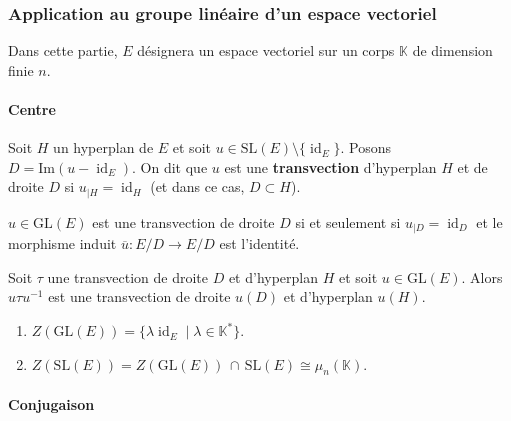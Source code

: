   \subsubsection{Application au groupe linéaire d'un espace vectoriel}

  Dans cette partie, $E$ désignera un espace vectoriel sur un corps $\mathbb{K}$ de dimension finie $n$.

  \paragraph{Centre}


  \begin{definition}
    Soit $H$ un hyperplan de $E$ et soit $u \in \mathrm{SL}(E) \setminus \{ \operatorname{id}_E \}$. Posons $D = \mathrm{Im}(u - \operatorname{id}_E)$. On dit que $u$ est une \textbf{transvection} d'hyperplan $H$ et de droite $D$ si $u_{|H} = \operatorname{id}_H$ (et dans ce cas, $D \subset H$).
  \end{definition}

  \begin{proposition}
    $u \in \mathrm{GL}(E)$ est une transvection de droite $D$ si et seulement si $u_{|D} = \operatorname{id}_D$ et le morphisme induit $\overline{u} : E/D \rightarrow E/D$ est l'identité.
  \end{proposition}

  \begin{proposition}
    Soit $\tau$ une transvection de droite $D$ et d'hyperplan $H$ et soit $u \in \mathrm{GL}(E)$. Alors $u \tau u^{-1}$ est une transvection de droite $u(D)$ et d'hyperplan $u(H)$.
  \end{proposition}

  \begin{corollary}
    \begin{enumerate}[label=(\roman*)]
      \item $Z(\mathrm{GL}(E)) = \{ \lambda \operatorname{id}_E \mid \lambda \in \mathbb{K}^* \}$.
      \item $Z(\mathrm{SL}(E)) = Z(\mathrm{GL}(E)) \, \cap \, \mathrm{SL}(E) \cong \mu_n(\mathbb{K})$.
    \end{enumerate}
  \end{corollary}

  \paragraph{Conjugaison}

